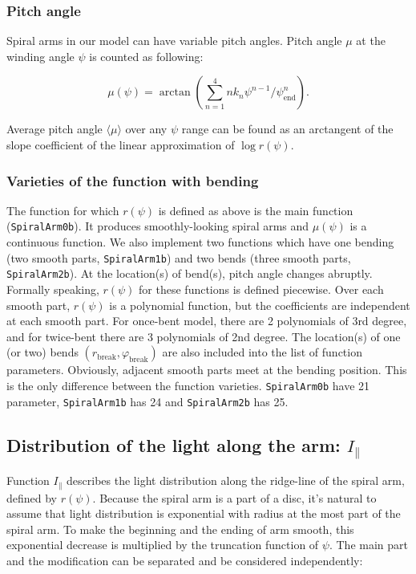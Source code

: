 \documentclass[12pt,a4paper]{article}
\begin{document}
\subsubsection{Pitch angle}
Spiral arms in our model can have variable pitch angles. Pitch angle $\mu$ at the winding angle $\psi$ is counted as following:

\begin{equation}
	\label{eq:mu_psi}
	\mu(\psi) = \arctan \left(\sum_{n=1}^4 n k_n \psi^{n - 1} / \psi_\text{end}^n\right).
\end{equation}

Average pitch angle $\langle\mu\rangle$ over any $\psi$ range can be found as an arctangent of the slope coefficient of the linear approximation of $\log r(\psi)$.

\subsubsection{Varieties of the function with bending}
\label{sec:bending}
The function for which $r(\psi)$ is defined as above is the main function (\verb*|SpiralArm0b|). It produces smoothly-looking spiral arms and $\mu(\psi)$ is a continuous function. We also implement two functions which have one bending (two smooth parts, \verb*|SpiralArm1b|) and two bends (three smooth parts, \verb*|SpiralArm2b|). At the location(s) of bend(s), pitch angle changes abruptly. Formally speaking, $r(\psi)$ for these functions is defined piecewise. Over each smooth part, $r(\psi)$ is a polynomial function, but the coefficients are independent at each smooth part. For once-bent model, there are 2 polynomials of 3rd degree, and for twice-bent there are 3 polynomials of 2nd degree. The location(s) of one (or two) bends $(r_\text{break}, \varphi_\text{break})$ are also included into the list of function parameters. Obviously, adjacent smooth parts meet at the bending position. This is the only difference between the function varieties. \verb*|SpiralArm0b| have 21 parameter, \verb*|SpiralArm1b| has 24 and \verb*|SpiralArm2b| has 25.

\subsection{Distribution of the light along the arm: $I_\parallel$}
Function $I_\parallel$ describes the light distribution along the ridge-line of the spiral arm, defined by $r(\psi)$. Because the spiral arm is a part of a disc, it's natural to assume that light distribution is exponential with radius at the most part of the spiral arm. To make the beginning and the ending of arm smooth, this exponential decrease is multiplied by the truncation function of $\psi$. The main part and the modification can be separated and be considered independently:
\end{document}

